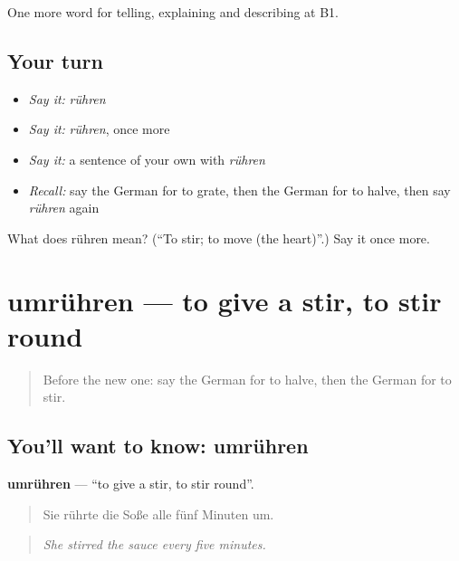 \begin{grammarlens}[title={What you've built}]
One more word for telling, explaining and describing at B1.
\end{grammarlens}

\subsection*{Your turn}
\begin{itemize}
\raggedright
  \item \emph{Say it:} \emph{rühren}
  \item \emph{Say it:} \emph{rühren}, once more
  \item \emph{Say it:} a sentence of your own with \emph{rühren}
  \item \emph{Recall:} say the German for to grate, then the German for to halve, then say \emph{rühren} again
\end{itemize}

\begin{tcolorbox}[breakable,colback=teal!4,colframe=teal!35!black,title={Before you move on}]
What does rühren mean? (\textquotedblleft{}To stir; to move (the heart)\textquotedblright{}.) Say it once more.
\end{tcolorbox}
\section[umrühren]{umrühren — to give a stir, to stir round}

\label{lesson:GE-C324-umruehren}



\begin{quote}
Before the new one: say the German for to halve, then the German for to stir.
\end{quote}

\subsection*{You'll want to know: umrühren}
\textbf{umrühren} — \textquotedblleft{}to give a stir, to stir round\textquotedblright{}.

\begin{quote}
Sie rührte die Soße alle fünf Minuten um.
\end{quote}

\begin{quote}
\emph{She stirred the sauce every five minutes.}
\end{quote}

